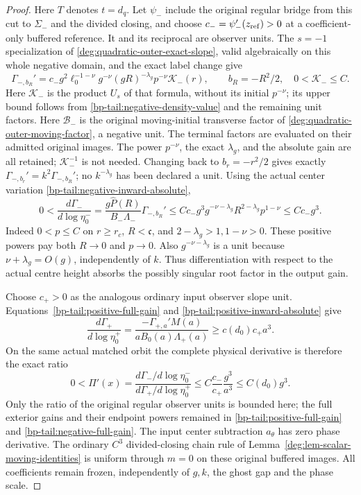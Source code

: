 \begin{proof}
Here \(T\) denotes \(t=d_q\). Let \(\psi_-\) include the original
regular bridge from this cut to \(\Sigma_-\) and the divided closing,
and choose \(c_-=\psi_-'(z_{\rm ref})>0\) at a coefficient-only
buffered reference. It and its reciprocal are observer units.
The \(s=-1\) specialization of
\eqref{deg:quadratic-outer-exact-slope}, valid algebraically on this
whole negative domain, and the exact label change give
\begin{equation}\label{bp-tail:negative-full-gain}
 \Gamma_{-,b_R}'=c_-g^2\ell_0^{-1-\nu}g^{-\nu}(gR)^{-\lambda_g}
                    p^{-\nu}\mathcal K_-(r),\qquad
 b_R=-R^2/2,\quad0<\mathcal K_-\le C.
\end{equation}
Here \(\mathcal K_-\) is the product \(U_s\) of that formula,
without its initial \(p^{-\nu}\); its upper bound follows from
\eqref{bp-tail:negative-density-value} and the remaining unit factors.
Here \(\mathscr B_-\) is the original moving-initial transverse
factor of \eqref{deg:quadratic-outer-moving-factor}, a negative unit.
The terminal factors are evaluated on their admitted original images.
The power \(p^{-\nu}\), the exact \(\lambda_g\), and the absolute
gain are all retained; \(\mathcal K_-^{-1}\) is not needed.
Changing back to \(b_r=-r^2/2\) gives exactly
\(\Gamma_{-,b_r}'=k^2\Gamma_{-,b_R}'\); no \(k^{-\lambda_g}\)
has been declared a unit.
Using the actual center variation \eqref{bp-tail:negative-inward-absolute},
\begin{equation}\label{bp-tail:negative-consumed-gain}
 0<\frac{d\Gamma_-}{d\log\eta_0^-}
   =\frac{g\widehat P(R)}{B_-\Lambda_-}\Gamma_{-,b_R}'
   \le Cc_-g^3g^{-\nu-\lambda_g}R^{2-\lambda_g}p^{1-\nu}
   \le Cc_-g^3.
\end{equation}
Indeed \(0<p\le C\) on \(r\ge r_c\), \(R<\mathfrak c\), and
\(2-\lambda_g>1,1-\nu>0\). These positive powers pay both
\(R\to0\) and \(p\to0\). Also \(g^{-\nu-\lambda_g}\) is a
unit because \(\nu+\lambda_g=O(g)\), independently of \(k\).
Thus differentiation with respect to the actual centre height absorbs
the possibly singular root factor in the output gain.

Choose \(c_+>0\) as the analogous ordinary input observer slope unit.
Equations~\eqref{bp-tail:positive-full-gain} and
\eqref{bp-tail:positive-inward-absolute} give
\[
 \frac{d\Gamma_+}{d\log\eta_0^+}
   =\frac{-\Gamma_{+,a}'M(a)}{aB_0(a)\Lambda_+(a)}
                           \ge c(d_0)c_+a^3.
\]
On the same actual matched orbit the complete physical derivative is
therefore the exact ratio
\[
 0<\Pi'(x)=
 \frac{d\Gamma_-/d\log\eta_0^-}{d\Gamma_+/d\log\eta_0^+}
 \le C\frac{c_-}{c_+}\frac{g^3}{a^3}\le C(d_0)g^3.
\]
Only the ratio of the original regular observer units is bounded here;
the full exterior gains and their endpoint powers remained in
\eqref{bp-tail:positive-full-gain} and \eqref{bp-tail:negative-full-gain}.
The input center subtraction \(a_\theta\) has zero phase derivative.
The ordinary \(C^3\) divided-closing chain rule of
Lemma~\ref{deg:lem-scalar-moving-identities} is uniform through
\(m=0\) on these original buffered images. All coefficients remain
frozen, independently of \(g,k\), the ghost gap and the phase scale.
\end{proof}


